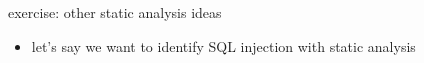 \begin{frame}{exercise: other static analysis ideas}
    \begin{itemize}
    \item let's say we want to identify SQL injection with static analysis
    \end{itemize}
\end{frame}
